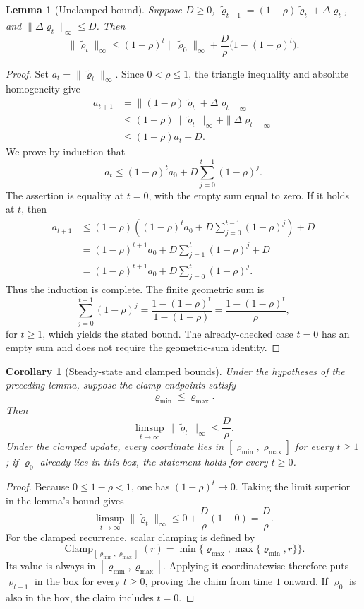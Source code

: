 \documentclass[11pt,oneside]{book}
\newtheorem{lemma}[definition]{Lemma}
\newtheorem{corollary}[definition]{Corollary}
\theoremstyle{remark}
\DeclareMathOperator{\Clamp}{Clamp}
\begin{document}
\begin{lemma}[Unclamped bound]
Suppose $D\ge0$,
$\widetilde\varrho_{t+1}=(1-\rho)\widetilde\varrho_t+\Delta\varrho_t$, and
$\|\Delta\varrho_t\|_\infty\le D$. Then
\[
\|\widetilde\varrho_t\|_\infty
\le(1-\rho)^t\|\widetilde\varrho_0\|_\infty
+\frac D\rho\bigl(1-(1-\rho)^t\bigr).
\]
\end{lemma}

\begin{proof}
Set $a_t=\|\widetilde\varrho_t\|_\infty$. Since $0<\rho\le1$, the triangle inequality and absolute homogeneity give
\[
\begin{aligned}
a_{t+1}
&=\|(1-\rho)\widetilde\varrho_t+\Delta\varrho_t\|_\infty\\
&\le (1-\rho)\|\widetilde\varrho_t\|_\infty+\|\Delta\varrho_t\|_\infty\\
&\le (1-\rho)a_t+D.
\end{aligned}
\]
We prove by induction that
\[
a_t\le (1-\rho)^t a_0+D\sum_{j=0}^{t-1}(1-\rho)^j.
\]
The assertion is equality at $t=0$, with the empty sum equal to zero. If it
holds at $t$, then
\[
\begin{aligned}
a_{t+1}
&\le(1-\rho)\left((1-\rho)^t a_0+
D\sum_{j=0}^{t-1}(1-\rho)^j\right)+D\\
&=(1-\rho)^{t+1}a_0+
D\sum_{j=1}^{t}(1-\rho)^j+D\\
&=(1-\rho)^{t+1}a_0+
D\sum_{j=0}^{t}(1-\rho)^j.
\end{aligned}
\]
Thus the induction is complete. The finite geometric sum is
\[
\sum_{j=0}^{t-1}(1-\rho)^j
=\frac{1-(1-\rho)^t}{1-(1-\rho)}
=\frac{1-(1-\rho)^t}{\rho},
\]
for $t\ge1$, which yields the stated bound. The already-checked case $t=0$
has an empty sum and does not require the geometric-sum identity.
\end{proof}

\begin{corollary}[Steady-state and clamped bounds]
Under the hypotheses of the preceding lemma, suppose the clamp endpoints
satisfy
\[
\varrho_{\min}\le\varrho_{\max}.
\]
Then
\[
\limsup_{t\to\infty}\|\widetilde\varrho_t\|_\infty\le \frac D\rho.
\]
Under the
clamped update, every coordinate lies in
$[\varrho_{\min},\varrho_{\max}]$ for every $t\ge1$; if $\varrho_0$ already lies in
this box, the statement holds for every $t\ge0$.
\end{corollary}

\begin{proof}
Because $0\le1-\rho<1$, one has $(1-\rho)^t\to0$. Taking the limit superior in the lemma's bound gives
\[
\limsup_{t\to\infty}\|\widetilde\varrho_t\|_\infty
\le 0+\frac D\rho(1-0)=\frac D\rho.
\]
For the clamped recurrence, scalar clamping is defined by
\[
\Clamp_{[\varrho_{\min},\varrho_{\max}]}(r)
=\min\{\varrho_{\max},\max\{\varrho_{\min},r\}\}.
\]
Its value is always in $[\varrho_{\min},\varrho_{\max}]$. Applying it
coordinatewise therefore puts $\varrho_{t+1}$ in the box for every $t\ge0$,
proving the claim from time $1$ onward. If $\varrho_0$ is also in the box, the
claim includes $t=0$.
\end{proof}
\end{document}
